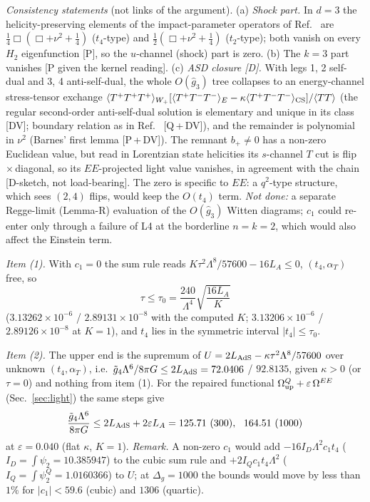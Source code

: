\documentclass[aps,prl,onecolumn,superscriptaddress,nofootinbib]{revtex4-2}
\begin{document}
\emph{Consistency statements} (not links of the argument). (a) \emph{Shock part.} In $d=3$ the helicity-preserving elements of the
impact-parameter operators of Ref.~\cite{CHP} are $\tfrac14\Box(\Box+\nu^2+\tfrac14)$ ($t_4$-type) and $\tfrac12(\Box+\nu^2+\tfrac14)$
($t_2$-type); both vanish on every $H_2$ eigenfunction [P], so the $u$-channel (shock) part is zero. (b) The $k=3$ part vanishes [P
given the kernel reading]. (c) \emph{ASD closure [D].} With legs 1, 2 self-dual and 3, 4 anti-self-dual, the whole $O(\hat g_3)$
tree collapses to an energy-channel stress-tensor exchange
$\langle T^+T^+T^+\rangle_{W_+}[\langle T^+T^-T^-\rangle_E-\kappa\langle T^+T^-T^-\rangle_{\rm CS}]/\langle TT\rangle$ (the regular
second-order anti-self-dual solution is elementary and unique in its class [DV]; boundary relation as in Ref.~\cite{JJMNS}
[Q\,+\,DV]), and the remainder is polynomial in $\nu^2$ (Barnes' first lemma [P\,+\,DV]). The remnant $b_+\ne0$ has a non-zero
Euclidean value, but read in Lorentzian state helicities its $s$-channel $T$ cut is flip\,$\times$\,diagonal, so its $EE$-projected
light value vanishes, in agreement with the chain [D-sketch, not load-bearing]. The zero is specific to $EE$: a $q^2$-type structure,
which sees $(2,4)$ flips, would keep the $O(t_4)$ term. \emph{Not done:} a separate Regge-limit (Lemma-R) evaluation of the
$O(\hat g_3)$ Witten diagrams; $c_1$ could re-enter only through a failure of L4 at the borderline $n=k=2$, which would also affect the
Einstein term.

\emph{Item (1).} With $c_1=0$ the sum rule reads $K\tau^2\Lambda^8/57600-16L_A\le0$, $(t_4,\alpha_T)$ free, so
\begin{equation}
\tau\le \tau_0=\frac{240}{\Lambda^4}\sqrt{\frac{16L_A}{K}}
\label{eq:taubound}
\end{equation}
($3.13262\times10^{-6}$ / $2.89131\times10^{-8}$ with the computed $K$; $3.13206\times10^{-6}$ / $2.89126\times10^{-8}$ at $K=1$), and $t_4$ lies in the symmetric interval $|t_4|\le\tau_0$.

\emph{Item (2).} The upper end is the supremum of $U=2L_{\rm AdS}-\kappa\tau^2\Lambda^8/57600$ over unknown $(t_4,\alpha_T)$, i.e.\
$\tilde g_4\Lambda^6/8\pi G\le2L_{\rm AdS}=72.0406$ / $92.8135$, given $\kappa>0$ (or $\tau=0$) and nothing from item (1). For the
repaired functional $\Omega^Q_{\rm up}+\varepsilon\,\Omega^{EE}$ (Sec.~\ref{sec:light}) the same steps give
\begin{equation}
\frac{\tilde g_4\Lambda^6}{8\pi G}\le2L_{\rm AdS}+2\varepsilon L_A=125.71\ (300),\ \ 164.51\ (1000)
\label{eq:repair}
\end{equation}
at $\varepsilon=0.040$ (flat $\kappa$, $K=1$). \emph{Remark.} A non-zero $c_1$ would add $-16I_D\Lambda^2c_1t_4$ ($I_D=\int\psi_2=10.385947$)
to the cubic sum rule and $+2I_Qc_1t_4\Lambda^2$ ($I_Q=\int\psi_2^Q=1.0160366$) to $U$; at $\Delta_g=1000$ the bounds would move by
less than $1\%$ for $|c_1|<59.6$ (cubic) and $1306$ (quartic).
\end{document}
